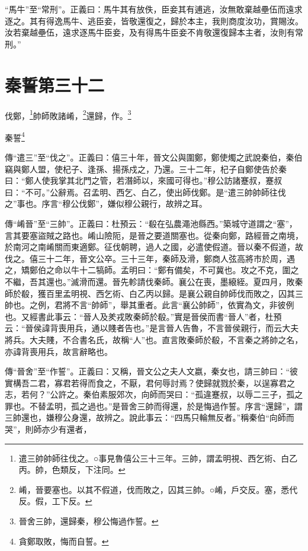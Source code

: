 {\noindent\shu{}\fzkt “馬牛”至“常刑”。正義曰：馬牛其有放佚，臣妾其有逋逃，汝無敢棄越壘伍而遠求逐之。其有得逸馬牛、逃臣妾，皆敬還復之，歸於本主，我則商度汝功，賞賜汝。汝若棄越壘伍，遠求逐馬牛臣妾，及有得馬牛臣妾不肯敬還復歸本主者，汝則有常刑。” \par}

\section{秦誓第三十二}


伐鄭，\footnote{遣三帥帥師往伐之。○事見魯僖公三十三年。三帥，謂孟明視、西乞術、白乙丙。帥，色類反，下注同。}帥師敗諸崤，\footnote{崤，晉要塞也。以其不假道，伐而敗之，囚其三帥。○崤，戶交反。塞，悉代反。假，工下反。}還歸，作。\footnote{晉舍三帥，還歸秦，穆公悔過作誓。}

秦誓\footnote{貪鄭取敗，悔而自誓。}


{\noindent\zhuan{}\fzbyks 傳“遣三”至“伐之”。正義曰：僖三十年，晉文公與圍鄭，鄭使燭之武說秦伯，秦伯竊與鄭人盟，使杞子、逢孫、揚孫戍之，乃還。三十二年，杞子自鄭使告於秦曰：“鄭人使我掌其北門之管，若潛師以，來國可得也。”穆公訪諸蹇叔，蹇叔曰：“不可。”公辭焉。召孟明、西乞、白乙，使出師伐鄭。是“遣三帥帥師往伐之”事也。序言“穆公伐鄭”，嫌似穆公親行，故辨之耳。 \par}

{\noindent\zhuan{}\fzbyks 傳“崤晉”至“三帥”。正義曰：杜預云：“殽在弘農澠池縣西。”築城守道謂之“塞”，言其要塞盜賊之路也。崤山險阨，是晉之要道關塞也。從秦向鄭，路經晉之南境，於南河之南崤關而東適鄭。征伐朝聘，過人之國，必遣使假道。晉以秦不假道，故伐之。僖三十二年，晉文公卒。三十三年，秦師及滑，鄭商人弦高將市於周，遇之，矯鄭伯之命以牛十二犒師。孟明曰：“鄭有備矣，不可冀也。攻之不克，圍之不繼，吾其還也。”滅滑而還。晉先軫請伐秦師。襄公在喪，墨縗絰。夏四月，敗秦師於殽，獲百里孟明視、西乞術、白乙丙以歸。是襄公親自帥師伐而敗之，囚其三帥也。之例，君將不言“帥師”，舉其重者。此言“襄公帥師”，依實為文，非彼例也。又經書此事云：“晉人及羑戎敗秦師於殽。”實是晉侯而書“晉人”者，杜預云：“晉侯諱背喪用兵，通以賤者告也。”是言晉人告魯，不言晉侯親行，而云大夫將兵。大夫賤，不合書名氏，故稱“人”也。直言敗秦師於殽，不言秦之將帥之名，亦諱背喪用兵，故言辭略也。 \par}

{\noindent\zhuan{}\fzbyks 傳“晉舍”至“作誓”。正義曰：又稱，晉文公之夫人文嬴，秦女也，請三帥曰：“彼實構吾二君，寡君若得而食之，不厭，君何辱討焉？使歸就戮於秦，以逞寡君之志，若何？”公許之。秦伯素服郊次，向師而哭曰：“孤違蹇叔，以辱二三子，孤之罪也。不替孟明，孤之過也。”是晉舍三帥而得還，於是悔過作誓。序言“還歸”，謂三帥還也，嫌穆公身還，故辨之。說此事云：“四馬只輪無反者。”稱秦伯“向師而哭”，則師亦少有還者， \par}

